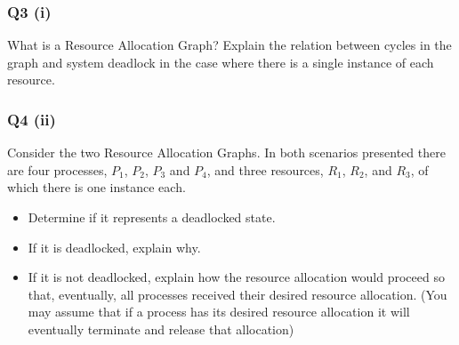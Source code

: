 \documentclass[a4paper, 10pt]{article}
\begin{document}
\subsubsection*{Q3 (i)}
What is a Resource Allocation Graph? Explain the relation between cycles in the graph and system deadlock in the case where there is a single instance of each resource.
\subsubsection*{Q4 (ii)}
Consider the two Resource Allocation Graphs. In both scenarios presented there are four processes, $P_1$, $P_2$, $P_3$ and $P_4$, and three resources, $R_1$, $R_2$, and $R_3$, of which there is one instance each.
\begin{itemize}
    \item Determine if it represents a deadlocked state.
    \item If it is deadlocked, explain why.
    \item If it is not deadlocked, explain how the resource allocation would
          proceed so that, eventually, all processes received their desired
          resource allocation. (You may assume that if a process has its
          desired resource allocation it will eventually terminate and release
          that allocation)
\end{itemize}
\vskip0.5cm
\begin{minipage}{0.5\textwidth}
    \begin{center}
    \end{center}
\end{minipage}
\end{document}
